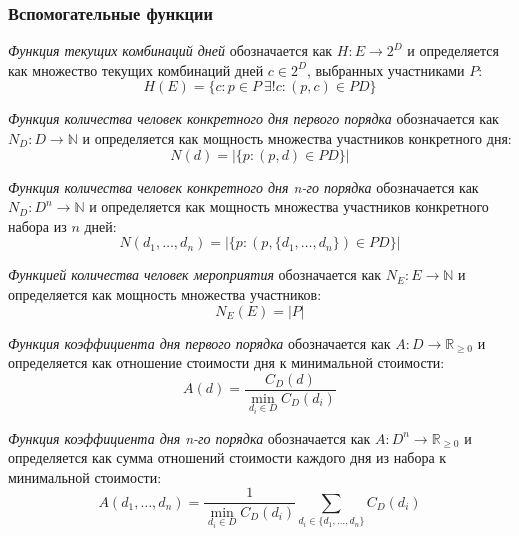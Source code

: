\subsubsection{Вспомогательные функции}

\textit{Функция текущих комбинаций дней} обозначается как $H: E \rightarrow 2^D$ и определяется как множество текущих комбинаций дней $c \in 2^D$, выбранных участниками $P$:
\begin{equation}
	H(E) = \{c: p \in P \ \exists! c: (p, c) \in PD\}
\end{equation}

\textit{Функция количества человек конкретного дня первого порядка} обозначается как $N_D: D \rightarrow \mathbb{N}$ и определяется как мощность множества участников конкретного дня:
\begin{equation}
	N(d) = |\{p: (p, d) \in PD\}|
\end{equation}

\textit{Функция количества человек конкретного дня n-го порядка} обозначается как $N_D: D^n \rightarrow \mathbb{N}$ и определяется как мощность множества участников конкретного набора из $n$ дней:
\begin{equation}
	N(d_1, \dots, d_n) = |\{p: (p, \{d_1, \dots, d_n\}) \in PD\}|
\end{equation}

\textit{Функцией количества человек мероприятия} обозначается как \newline $N_E: E \rightarrow \mathbb{N}$ и определяется как мощность множества участников:
\begin{equation}
	N_E(E) = |P|
\end{equation}

\textit{Функция коэффициента дня первого порядка} обозначается как \newline $A: D \rightarrow \mathbb{R}_{\ge 0}$ и определяется как отношение стоимости дня к минимальной стоимости:
\begin{equation}
	A(d) = \frac{C_D(d)}{\min_{d_i \in D}{C_D(d_i)}}
\end{equation}

\textit{Функция коэффициента дня n-го порядка} обозначается как \newline $A: D^n \rightarrow \mathbb{R}_{\ge 0}$ и определяется как сумма отношений стоимости каждого дня из набора к минимальной стоимости:
\begin{equation}
	A(d_1, \dots, d_n) = \frac{1}{\min_{d_i \in D}{C_D(d_i)}}\sum_{d_i \in \{d_1, \dots, d_n\}}{C_D(d_i)}
\end{equation}

